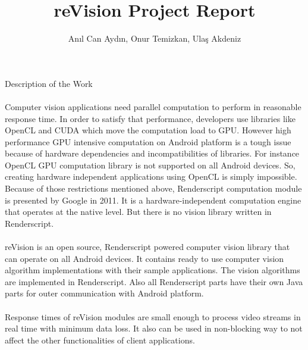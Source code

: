 \documentclass[12pt, a4paper]{article} \pagenumbering{gobble}
\begin{document}
  \author{An{\i}l Can Ayd{\i}n, Onur Temizkan, Ula\c{s} Akdeniz}
  \title{reVision Project Report}
  \maketitle
\newpage
\begin{section}{Description of the Work}
\paragraph{}{%
  Computer vision applications need parallel computation to perform in reasonable response time.
  In order to satisfy that performance, developers use libraries like OpenCL and CUDA which move the computation
  load to GPU. However high performance GPU intensive computation on Android platform is a tough issue because
  of hardware dependencies and incompatibilities of libraries. For instance OpenCL GPU computation library is not 
  supported on all Android devices. So, creating hardware independent applications using OpenCL is simply impossible.
  Because of those restrictions mentioned above, Renderscript computation module is presented by Google in 2011.
  It is ﻿a hardware-independent computation engine that operates at the native level. But there is no vision library
  written in Renderscript.
}
\paragraph{}{reVision is an open source, Renderscript powered computer vision library that can operate on all Android devices. It contains ready to use computer vision algorithm implementations with their sample applications. The vision algorithms are implemented in Renderscript. Also all Renderscript parts have their own Java parts for outer communication with Android platform.}
\paragraph{}{Response times of reVision modules are small enough to process video streams in real time with minimum data loss. It also can be used in non-blocking way to not affect the other functionalities of client applications.}
\end{section}

\newpage
\end{document}
